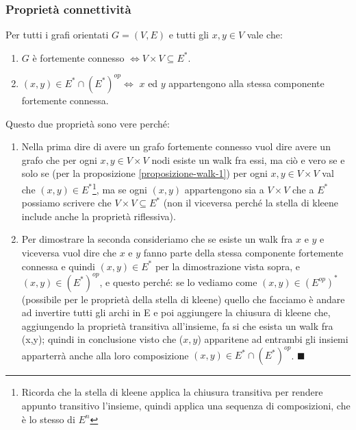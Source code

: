 \subsubsection{Proprietà connettività}
\begin{proposition}\label{proposizione-connettività-1}
    Per tutti i grafi orientati $G=(V,E)$ e tutti gli $x,y \in V$ vale che:
    \begin{enumerate}
        \item $G$ è fortemente connesso $\Longleftrightarrow V \times V \subseteq E^*$.
        \item $(x,y) \in E^* \cap (E^*)^{op} \Longleftrightarrow$ $x$ ed $y$ appartengono alla stessa componente fortemente connessa.
    \end{enumerate}
\end{proposition}
\begin{demostration} \label{dimostrazione-prop-1}
Questo due proprietà sono vere perché:
\begin{enumerate}
    \item Nella prima dire di avere un grafo fortemente connesso vuol dire avere un grafo che per ogni $x, y \in V \times V$ nodi esiste un walk fra essi, ma ciò e vero se e solo se (per la proposizione \ref{proposizione-walk-1}) per ogni $x, y \in V \times V$ val che  $(x,y) \in E^*$\footnote{Ricorda che la stella di kleene applica la chiusura transitiva per rendere appunto transitivo l'insieme, quindi applica una sequenza di composizioni, che è lo stesso di $E^n$}, ma se ogni $(x,y)$ appartengono sia a $V \times V$ che a $E^*$ possiamo scrivere che $V \times V \subseteq E^*$ (non il viceversa perché la stella di kleene include anche la proprietà riflessiva).
    \item Per dimostrare la seconda consideriamo che se esiste un walk fra $x$ e $y$ e viceversa vuol dire che $x$ e $y$ fanno parte della stessa componente fortemente connessa e quindi $(x,y) \in E^*$ per la dimostrazione vista sopra, e $(x,y) \in (E^*)^{op}$, e questo perché: se lo vediamo come $(x,y) \in (E^{op})^*$ (possibile per le proprietà della stella di kleene) quello che facciamo è andare ad invertire tutti gli archi in E e poi aggiungere la chiusura di kleene che, aggiungendo la proprietà transitiva all'insieme, fa si che esista un walk fra (x,y); quindi in conclusione visto che ($x,y$) apparitene ad entrambi gli insiemi apparterrà anche alla loro composizione $(x,y) \in E^* \cap (E^*)^{op}$. $\blacksquare$
\end{enumerate}
\end{demostration}

